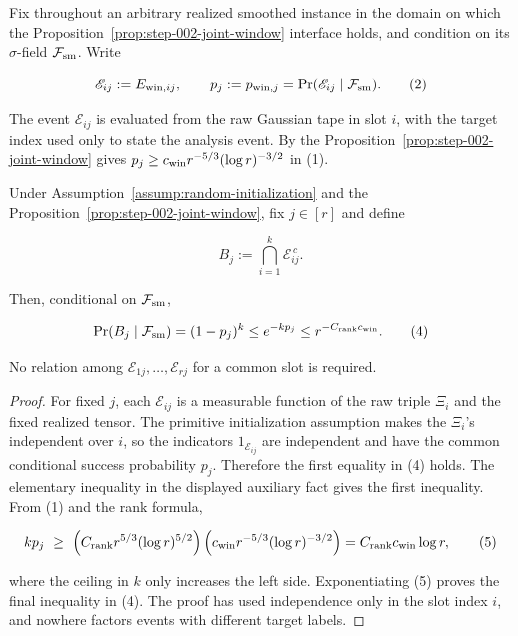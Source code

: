 Fix throughout an arbitrary realized smoothed instance in the domain on
which the Proposition~\ref{prop:step-002-joint-window} interface holds, and condition on its
\(\sigma\)-field \(\mathcal F_{\rm sm}\). Write

\[
\mathscr E_{ij}:=E_{{\rm win},ij},\qquad
p_j:=p_{{\rm win},j}=\Pr(\mathscr E_{ij}\mid\mathcal F_{\rm sm}).
\tag{2}
\]

The event \(\mathscr E_{ij}\) is evaluated from the raw Gaussian tape in slot
\(i\), with the target index used only to state the analysis event. By the
Proposition~\ref{prop:step-002-joint-window} gives
\(p_j\ge c_{\rm win}r^{-5/3}(\log r)^{-3/2}\) in (1).


\begin{lemma}\label{lem:step-003-slot-miss}
Under Assumption~\ref{assump:random-initialization} and the Proposition~\ref{prop:step-002-joint-window}, fix \(j\in[r]\) and define

\[
B_j:=\bigcap_{i=1}^k\mathscr E_{ij}^{\,c}.
\tag{3}
\]

Then, conditional on \(\mathcal F_{\rm sm}\),

\[
\Pr(B_j\mid\mathcal F_{\rm sm})=(1-p_j)^k
\le e^{-kp_j}
\le r^{-C_{\rm rank}c_{\rm win}}.
\tag{4}
\]

No relation among \(\mathscr E_{1j},\ldots,\mathscr E_{rj}\) for a common
slot is required.

\begin{proof}
For fixed \(j\), each \(\mathscr E_{ij}\) is a measurable function of the
raw triple \(\Xi_i\) and the fixed realized tensor. The primitive
initialization assumption makes the \(\Xi_i\)'s independent over \(i\), so
the indicators \(1_{\mathscr E_{ij}}\) are independent and have the common
conditional success probability \(p_j\). Therefore the first equality in
(4) holds. The elementary inequality in the displayed auxiliary fact gives the first
inequality. From (1) and the rank formula,

\[
kp_j\ \ge\ \left(C_{\rm rank}r^{5/3}(\log r)^{5/2}\right)
   \left(c_{\rm win}r^{-5/3}(\log r)^{-3/2}\right)
 =C_{\rm rank}c_{\rm win}\log r,
\tag{5}
\]

where the ceiling in \(k\) only increases the left side. Exponentiating
(5) proves the final inequality in (4). The proof has used independence
only in the slot index \(i\), and nowhere factors events with different
target labels. 


\end{proof}
\end{lemma}
